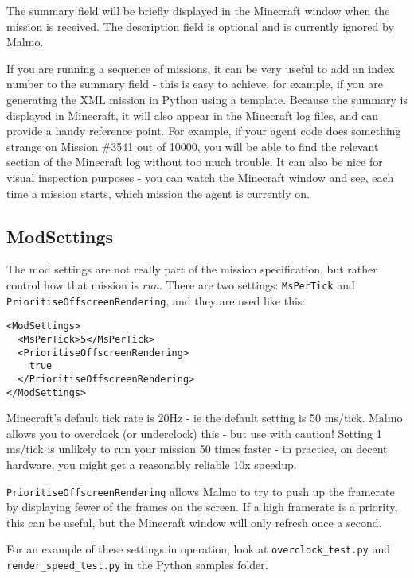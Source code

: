 \documentclass[11pt]{article} %
\begin{document}
The summary field will be briefly displayed in the Minecraft window when the mission is received. The description field is optional and is currently ignored by Malmo.

\begin{mdframed}[style=tipFrame]
If you are running a sequence of missions, it can be very useful to add an index number to the summary field - this is easy to achieve, for example, if you are generating the XML mission in Python using a template. Because the summary is displayed in Minecraft, it will also appear in the Minecraft log files, and can provide a handy reference point. For example, if your agent code does something strange on Mission \#3541 out of 10000, you will be able to find the relevant section of the Minecraft log without too much trouble. It can also be nice for visual inspection purposes - you can watch the Minecraft window and see, each time a mission starts, which mission the agent is currently on.
\end{mdframed}

\subsection{ModSettings}

The mod settings are not really part of the mission specification, but rather control how that mission is \emph{run}. There are two settings: \lstinline!MsPerTick! and \lstinline!PrioritiseOffscreenRendering!, and they are used like this:

\begin{lstlisting}[frame=lines]
<ModSettings>
  <MsPerTick>5</MsPerTick>
  <PrioritiseOffscreenRendering>
    true
  </PrioritiseOffscreenRendering>
</ModSettings>
\end{lstlisting}

Minecraft's default tick rate is 20Hz - ie the default setting is 50 ms/tick. Malmo allows you to overclock (or underclock) this - but use with caution! Setting 1 ms/tick is unlikely to run your mission 50 times faster - in practice, on decent hardware, you might get a reasonably reliable 10x speedup.

\lstinline!PrioritiseOffscreenRendering! allows Malmo to try to push up the framerate by displaying fewer of the frames on the screen. If a high framerate is a priority, this can be useful, but the Minecraft window will only refresh once a second.

For an example of these settings in operation, look at \lstinline!overclock_test.py! and \lstinline!render_speed_test.py! in the Python samples folder.
\end{document}
